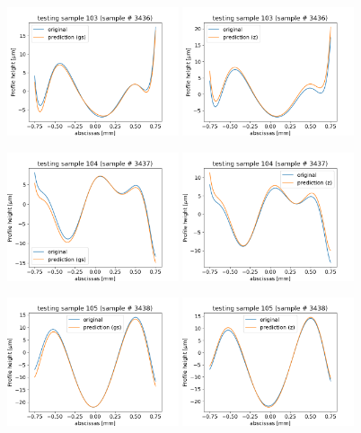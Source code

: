 \documentclass[]{article}
\begin{document}
\begin{figure}
 
    \includegraphics[width=0.45\textwidth]{figures/v13p103.png}
    \includegraphics[width=0.45\textwidth]{figures/v14p103.png}

    
    \includegraphics[width=0.45\textwidth]{figures/v13p104.png}
    \includegraphics[width=0.45\textwidth]{figures/v14p104.png}

    \includegraphics[width=0.45\textwidth]{figures/v13p105.png}
    \includegraphics[width=0.45\textwidth]{figures/v14p105.png}

\end{figure}
\end{document}
